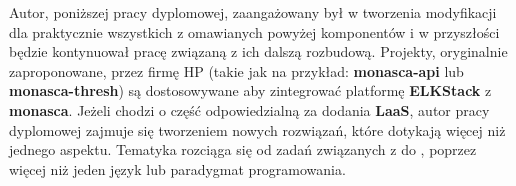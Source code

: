 Autor, poniższej pracy dyplomowej, zaangażowany był w tworzenia modyfikacji dla praktycznie wszystkich z omawianych powyżej komponentów i w przyszłości będzie kontynuował pracę związaną z ich dalszą rozbudową.
Projekty, oryginalnie zaproponowane, przez firmę HP (takie jak na przykład: \textbf{monasca-api} lub \textbf{monasca-thresh})
są dostosowywane aby zintegrować platformę \textbf{ELKStack} z \textbf{monasca}.
Jeżeli chodzi o część odpowiedzialną za dodania \textbf{LaaS}, autor pracy dyplomowej zajmuje się
tworzeniem nowych rozwiązań, które dotykają więcej niż jednego aspektu. Tematyka rozciąga się
od zadań związanych z  
do , poprzez więcej niż jeden język lub paradygmat programowania.

